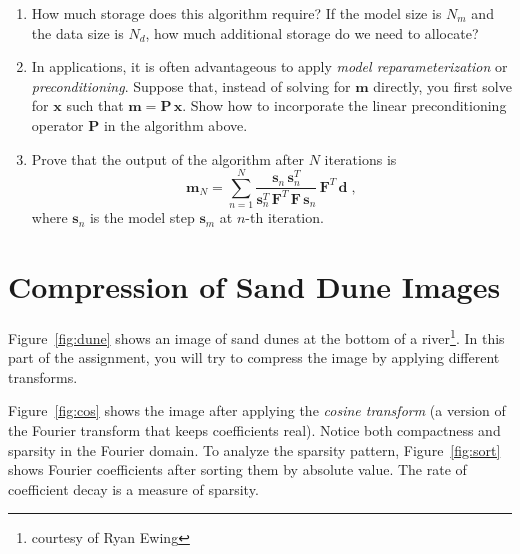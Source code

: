 \begin{enumerate}
\item How much storage does this algorithm require? If the model size is $N_m$ and the data size is $N_d$, 
how much additional storage do we need to allocate?
\item  In applications, it is often advantageous to apply \emph{model
    reparameterization} or \emph{preconditioning}. Suppose that,
  instead of solving for $\mathbf{m}$ directly, you first solve for
  $\mathbf{x}$ such that $\mathbf{m} = \mathbf{P}\,\mathbf{x}$. Show
  how to incorporate the linear preconditioning operator $\mathbf{P}$
  in the algorithm above.
\item Prove that the output of the algorithm after $N$ iterations is
\begin{equation}
\label{eq:mres}
\mathbf{m}_N = \sum\limits_{n=1}^{N} \frac{\mathbf{s}_n\,\mathbf{s}_n^T}{\mathbf{s}_n^T\,\mathbf{F}^T\,\mathbf{F}\,\mathbf{s}_n}\,\mathbf{F}^T\,\mathbf{d}\;,
\end{equation}
where $\mathbf{s}_n$ is the model step $\mathbf{s}_m$ at $n$-th iteration.
\end{enumerate}

\section{Compression of Sand Dune Images}


Figure~\ref{fig:dune} shows an image of sand dunes at the bottom of a
river\footnote{courtesy of Ryan Ewing}. In this part of the assignment, you
will try to compress the image by applying different transforms.


Figure~\ref{fig:cos} shows the image after applying the \emph{cosine
transform} (a version of the Fourier transform that keeps coefficients
real). Notice both compactness and sparsity in the Fourier domain. To
analyze the sparsity pattern, Figure~\ref{fig:sort} shows Fourier
coefficients after sorting them by absolute value. The rate 
of coefficient decay is a measure of sparsity.


